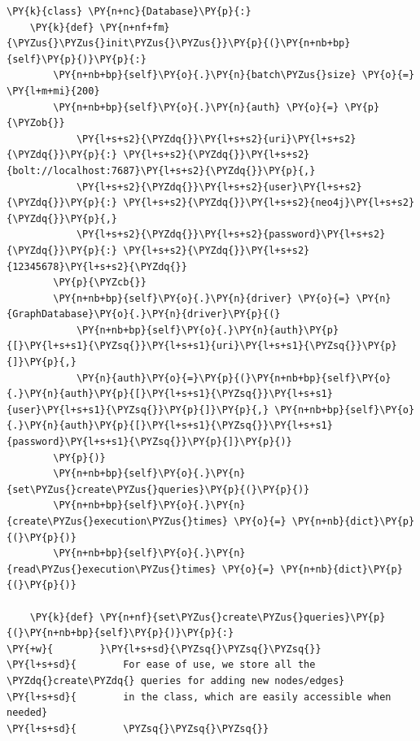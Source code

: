     \begin{tcolorbox}[breakable, size=fbox, boxrule=1pt, pad at break*=1mm,colback=cellbackground, colframe=cellborder]
\begin{Verbatim}[commandchars=\\\{\}]
\PY{k}{class} \PY{n+nc}{Database}\PY{p}{:}
    \PY{k}{def} \PY{n+nf+fm}{\PYZus{}\PYZus{}init\PYZus{}\PYZus{}}\PY{p}{(}\PY{n+nb+bp}{self}\PY{p}{)}\PY{p}{:}
        \PY{n+nb+bp}{self}\PY{o}{.}\PY{n}{batch\PYZus{}size} \PY{o}{=} \PY{l+m+mi}{200}
        \PY{n+nb+bp}{self}\PY{o}{.}\PY{n}{auth} \PY{o}{=} \PY{p}{\PYZob{}}
            \PY{l+s+s2}{\PYZdq{}}\PY{l+s+s2}{uri}\PY{l+s+s2}{\PYZdq{}}\PY{p}{:} \PY{l+s+s2}{\PYZdq{}}\PY{l+s+s2}{bolt://localhost:7687}\PY{l+s+s2}{\PYZdq{}}\PY{p}{,}
            \PY{l+s+s2}{\PYZdq{}}\PY{l+s+s2}{user}\PY{l+s+s2}{\PYZdq{}}\PY{p}{:} \PY{l+s+s2}{\PYZdq{}}\PY{l+s+s2}{neo4j}\PY{l+s+s2}{\PYZdq{}}\PY{p}{,}
            \PY{l+s+s2}{\PYZdq{}}\PY{l+s+s2}{password}\PY{l+s+s2}{\PYZdq{}}\PY{p}{:} \PY{l+s+s2}{\PYZdq{}}\PY{l+s+s2}{12345678}\PY{l+s+s2}{\PYZdq{}}
        \PY{p}{\PYZcb{}}
        \PY{n+nb+bp}{self}\PY{o}{.}\PY{n}{driver} \PY{o}{=} \PY{n}{GraphDatabase}\PY{o}{.}\PY{n}{driver}\PY{p}{(}
            \PY{n+nb+bp}{self}\PY{o}{.}\PY{n}{auth}\PY{p}{[}\PY{l+s+s1}{\PYZsq{}}\PY{l+s+s1}{uri}\PY{l+s+s1}{\PYZsq{}}\PY{p}{]}\PY{p}{,}
            \PY{n}{auth}\PY{o}{=}\PY{p}{(}\PY{n+nb+bp}{self}\PY{o}{.}\PY{n}{auth}\PY{p}{[}\PY{l+s+s1}{\PYZsq{}}\PY{l+s+s1}{user}\PY{l+s+s1}{\PYZsq{}}\PY{p}{]}\PY{p}{,} \PY{n+nb+bp}{self}\PY{o}{.}\PY{n}{auth}\PY{p}{[}\PY{l+s+s1}{\PYZsq{}}\PY{l+s+s1}{password}\PY{l+s+s1}{\PYZsq{}}\PY{p}{]}\PY{p}{)}
        \PY{p}{)}
        \PY{n+nb+bp}{self}\PY{o}{.}\PY{n}{set\PYZus{}create\PYZus{}queries}\PY{p}{(}\PY{p}{)}
        \PY{n+nb+bp}{self}\PY{o}{.}\PY{n}{create\PYZus{}execution\PYZus{}times} \PY{o}{=} \PY{n+nb}{dict}\PY{p}{(}\PY{p}{)}
        \PY{n+nb+bp}{self}\PY{o}{.}\PY{n}{read\PYZus{}execution\PYZus{}times} \PY{o}{=} \PY{n+nb}{dict}\PY{p}{(}\PY{p}{)}

    \PY{k}{def} \PY{n+nf}{set\PYZus{}create\PYZus{}queries}\PY{p}{(}\PY{n+nb+bp}{self}\PY{p}{)}\PY{p}{:}
\PY{+w}{        }\PY{l+s+sd}{\PYZsq{}\PYZsq{}\PYZsq{}}
\PY{l+s+sd}{        For ease of use, we store all the \PYZdq{}create\PYZdq{} queries for adding new nodes/edges}
\PY{l+s+sd}{        in the class, which are easily accessible when needed}
\PY{l+s+sd}{        \PYZsq{}\PYZsq{}\PYZsq{}}
        

\end{Verbatim}
\end{tcolorbox}
